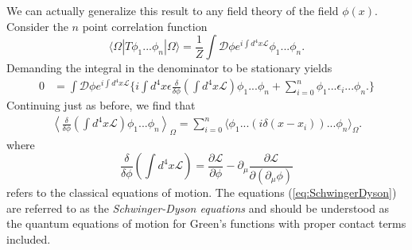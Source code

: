 \documentclass[twoside,utf8]{article}
\newcommand{\ket}[1] { |#1\rangle }
\newcommand{\bra}[1] { \langle #1 | }
\begin{document}
We can actually generalize this result to any field theory of the field $\phi(x)$. Consider the $n$ point correlation function
\[
\bra{\Omega} T\phi_1 ... \phi_n\ket{\Omega}
= \frac{1}{Z}\int \mathcal{D}\phi e^{i\int d^4x \mathcal{L}} \phi_1 ... \phi_n.
\]
Demanding the integral in the denominator to be stationary yields
\begin{equation*}
	\begin{align}
	0
	&=
	\int \mathcal{D}\phi e^{i\int d^4x \mathcal{L}}
	\bigg\{
	i\int d^4 x \epsilon \frac{\delta}{\delta \phi}\left(\int d^4x \mathcal{L}\right) \phi_1 ... \phi_n + \sum_{i=0}^n \phi_1 ... \epsilon_i ... \phi_n.
	\bigg\}
	\end{align}
\end{equation*}
Continuing just as before, we find that
\begin{equation}
	\begin{align}
	\left\langle \frac{\delta}{\delta \phi}\left(\int d^4x \mathcal{L}\right) \phi_1 ... \phi_n \right\rangle_\Omega
  =
	\sum_{i=0}^n \langle \phi_1 ... (i\delta(x-x_i)) ... \phi_n \rangle_\Omega.
	\end{align}
	\label{eq:SchwingerDyson}
\end{equation}
where
\[
\frac{\delta}{\delta \phi}\left(\int d^4x \mathcal{L}\right)
=
\frac{\partial \mathcal{L}}{\partial \phi}
-\partial_\mu\frac{\partial \mathcal{L}}{\partial(\partial_\mu\phi)}
\]
refers to the classical equations of motion. The equations (\ref{eq:SchwingerDyson}) are referred to as the {\it Schwinger-Dyson equations} and should be understood as the quantum equations of motion for Green's functions with proper contact terms included.








\end{document}
